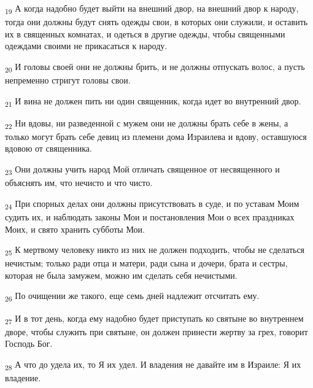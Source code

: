 \begin{tcolorbox}
\textsubscript{19} А когда надобно будет выйти на внешний двор, на внешний двор к народу, тогда они должны будут снять одежды свои, в которых они служили, и оставить их в священных комнатах, и одеться в другие одежды, чтобы священными одеждами своими не прикасаться к народу.
\end{tcolorbox}
\begin{tcolorbox}
\textsubscript{20} И головы своей они не должны брить, и не должны отпускать волос, а пусть непременно стригут головы свои.
\end{tcolorbox}
\begin{tcolorbox}
\textsubscript{21} И вина не должен пить ни один священник, когда идет во внутренний двор.
\end{tcolorbox}
\begin{tcolorbox}
\textsubscript{22} Ни вдовы, ни разведенной с мужем они не должны брать себе в жены, а только могут брать себе девиц из племени дома Израилева и вдову, оставшуюся вдовою от священника.
\end{tcolorbox}
\begin{tcolorbox}
\textsubscript{23} Они должны учить народ Мой отличать священное от несвященного и объяснять им, что нечисто и что чисто.
\end{tcolorbox}
\begin{tcolorbox}
\textsubscript{24} При спорных делах они должны присутствовать в суде, и по уставам Моим судить их, и наблюдать законы Мои и постановления Мои о всех праздниках Моих, и свято хранить субботы Мои.
\end{tcolorbox}
\begin{tcolorbox}
\textsubscript{25} К мертвому человеку никто из них не должен подходить, чтобы не сделаться нечистым; только ради отца и матери, ради сына и дочери, брата и сестры, которая не была замужем, можно им сделать себя нечистыми.
\end{tcolorbox}
\begin{tcolorbox}
\textsubscript{26} По очищении же такого, еще семь дней надлежит отсчитать ему.
\end{tcolorbox}
\begin{tcolorbox}
\textsubscript{27} И в тот день, когда ему надобно будет приступать ко святыне во внутреннем дворе, чтобы служить при святыне, он должен принести жертву за грех, говорит Господь Бог.
\end{tcolorbox}
\begin{tcolorbox}
\textsubscript{28} А что до удела их, то Я их удел. И владения не давайте им в Израиле: Я их владение.
\end{tcolorbox}
